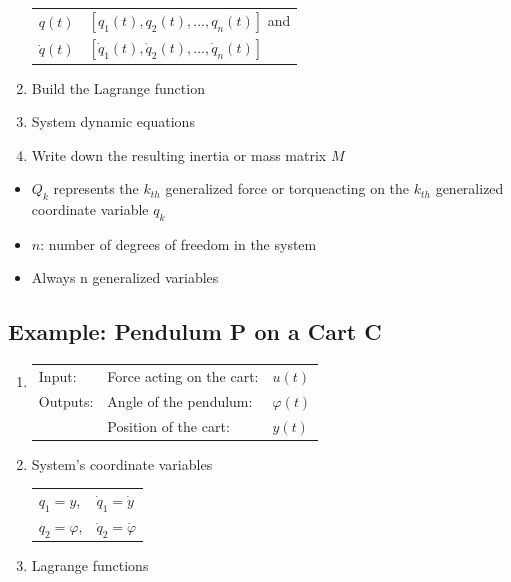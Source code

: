 \documentclass[10pt,a4paper]{scrartcl}
\begin{document}
\begin{multicols*}{3}
\begin{enumerate}
\begin{tabular}{l@{ = }l}
$q(t)$&$[q_1(t),q_2(t),\ldots,q_n(t)]$ and\\
$\dot{q}(t)$&$[\dot{q}_1(t),\dot{q}_2(t),\ldots,\dot{q}_n(t)]$
\end{tabular}
\item Build the Lagrange function
\item System dynamic equations
\item Write down the resulting inertia or mass matrix $M$
\end{enumerate}

\begin{itemize}
\item $Q_k$ represents the $k_{th}$ \glqq generalized force or torque\grqq acting on the $k_{th}$ generalized coordinate variable $q_k$
\item $n$: number of degrees of freedom in the system
\item Always n generalized variables
\end{itemize}

\subsection{Example: Pendulum P on a Cart C}


\begin{enumerate}
\item \begin{tabular}{lll}Input:&Force acting on the cart:&$u(t)$\\Outputs:&Angle of the pendulum:&$\varphi(t)$\\&Position of the cart:&$y(t)$\end{tabular}
\item System's coordinate variables
\begin{tabular}{ll}
$q_1 = y$,&$\dot{q}_1=\dot{y}$\\
$q_2 = \varphi$,&$\dot{q}_2=\dot{\varphi}$
\end{tabular}
\item Lagrange functions


\end{enumerate}
\end{multicols*}
\end{document}
